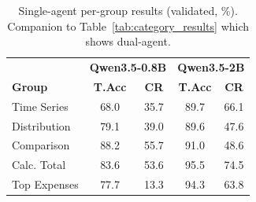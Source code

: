 \begin{table}[h]
\centering
\small
\caption{Single-agent per-group results (validated, \%). Companion to Table~\ref{tab:category_results} which shows dual-agent.}
\label{tab:single_category_results}
\begin{tabular}{@{}l|cc|cc@{}}
\toprule
& \multicolumn{2}{c|}{\textbf{Qwen3.5-0.8B}} & \multicolumn{2}{c}{\textbf{Qwen3.5-2B}} \\
\textbf{Group} & \textbf{T.Acc} & \textbf{CR} & \textbf{T.Acc} & \textbf{CR} \\
\midrule
Time Series & 68.0 & 35.7 & 89.7 & 66.1 \\
Distribution & 79.1 & 39.0 & 89.6 & 47.6 \\
Comparison & 88.2 & 55.7 & 91.0 & 48.6 \\
Calc. Total & 83.6 & 53.6 & 95.5 & 74.5 \\
Top Expenses & 77.7 & 13.3 & 94.3 & 63.8 \\
\bottomrule
\end{tabular}
\end{table}